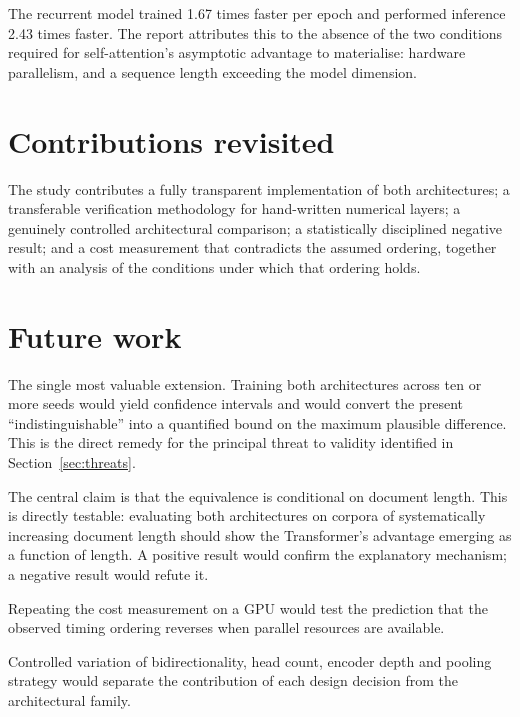  The recurrent model
trained 1.67 times faster per epoch and performed inference 2.43 times faster. The report attributes
this to the absence of the two conditions required for self-attention's asymptotic advantage to
materialise: hardware parallelism, and a sequence length exceeding the model dimension.

\section{Contributions revisited}

The study contributes a fully transparent implementation of both architectures; a transferable
verification methodology for hand-written numerical layers; a genuinely controlled architectural
comparison; a statistically disciplined negative result; and a cost measurement that contradicts
the assumed ordering, together with an analysis of the conditions under which that ordering holds.

\section{Future work}

 The single most valuable extension. Training both architectures across
ten or more seeds would yield confidence intervals and would convert the present
``indistinguishable'' into a quantified bound on the maximum plausible difference. This is the
direct remedy for the principal threat to validity identified in Section~\ref{sec:threats}.

 The central claim is that the equivalence is conditional on
document length. This is directly testable: evaluating both architectures on corpora of
systematically increasing document length should show the Transformer's advantage emerging as a
function of length. A positive result would confirm the explanatory mechanism; a negative result
would refute it.

 Repeating the cost measurement on a GPU would test the prediction
that the observed timing ordering reverses when parallel resources are available.

 Controlled variation of bidirectionality, head count, encoder depth
and pooling strategy would separate the contribution of each design decision from the architectural
family.

